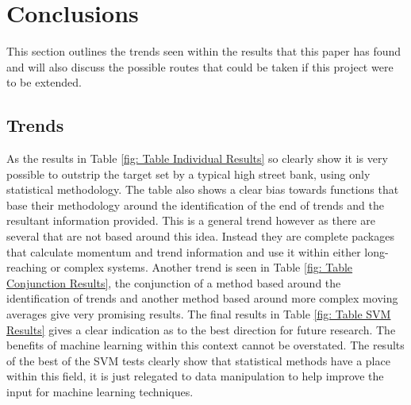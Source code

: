 \documentclass[conference]{IEEEtran}
\begin{document}

\section{Conclusions}

This section outlines the trends seen within the results that this paper has found and will also discuss the possible routes that could be taken if this project were to be extended.

\subsection{Trends}

As the results in Table \ref{fig: Table Individual Results} so clearly show it is very possible to outstrip the target set by a typical high street bank, using only statistical methodology. The table also shows a clear bias towards functions that base their methodology around the identification of the end of trends and the resultant information provided. This is a general trend however as there are several that are not based around this idea. Instead they are complete packages that calculate momentum and trend information and use it within either long-reaching or complex systems. 
Another trend is seen in Table \ref{fig: Table Conjunction Results}, the conjunction of a method based around the identification of trends and another method based around more complex moving averages give very promising results. 
The final results in Table \ref{fig: Table SVM Results} gives a clear indication as to the best direction for future research. The benefits of machine learning within this context cannot be overstated. The results of the best of the SVM tests clearly show that statistical methods have a place within this field, it is just relegated to data manipulation to help improve the input for machine learning techniques.\\
\end{document}
